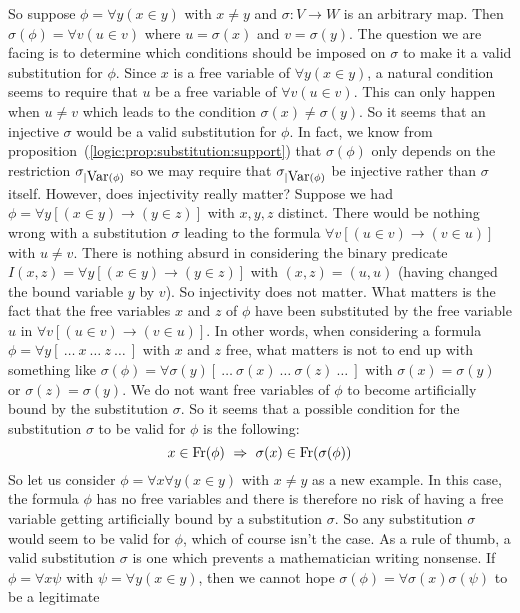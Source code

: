 So suppose $\phi=\forall y(x\in y)$ with $x\neq y$ and $\sigma:V\to
W$ is an arbitrary map. Then $\sigma(\phi) = \forall v(u\in v)$
where $u=\sigma(x)$ and $v=\sigma(y)$. The question we are facing is
to determine which conditions should be imposed on $\sigma$ to make
it a valid substitution for $\phi$. Since $x$ is a free variable of
$\forall y(x\in y)$, a natural condition seems to require that $u$
be a free variable of $\forall v(u\in v)$. This can only happen when
$u\neq v$ which leads to the condition $\sigma(x)\neq\sigma(y)$. So
it seems that an injective $\sigma$ would be a valid substitution
for $\phi$. In fact, we know from
proposition~(\ref{logic:prop:substitution:support}) that
$\sigma(\phi)$ only depends on the restriction
$\sigma_{|\mbox{\rm Var}(\phi)}$ so we may require that $\sigma_{|\mbox{\rm Var}(\phi)}$
be injective rather than $\sigma$ itself. However, does injectivity
really matter? Suppose we had $\phi=\forall y[(x\in y)\to (y\in z)]$
with $x,y,z$ distinct. There would be nothing wrong with a
substitution $\sigma$ leading to the formula $\forall v[(u\in
v)\to(v\in u)]$ with $u\neq v$. There is nothing absurd in
considering the binary predicate $I(x,z) =\forall y[(x\in y)\to(y\in
z)]$ with $(x,z)=(u,u)$ (having changed the bound variable $y$ by
$v$). So injectivity does not matter. What matters is the fact that
the free variables $x$ and $z$ of $\phi$ have been substituted by
the free variable $u$ in $\forall v[(u\in v)\to(v\in u)]$. In other
words, when considering a formula $\phi=\forall y[\ \ldots\ x\
\ldots\ z\ \ldots\ ]$ with $x$ and $z$ free, what matters is not to
end up with something like $\sigma(\phi)=\forall \sigma(y)[\ \ldots
\ \sigma(x)\ \ldots\ \sigma(z)\ \ldots\ ]$ with
$\sigma(x)=\sigma(y)$ or $\sigma(z) = \sigma(y)$. We do not want
free variables of $\phi$ to become artificially bound by the
substitution $\sigma$. So it seems that a possible condition for the
substitution $\sigma$ to be valid for $\phi$ is the following:
    \[
    x\in\free(\phi)\ \Rightarrow\ \sigma(x)\in\free(\sigma(\phi))
    \]
So let us consider $\phi=\forall x\forall y(x\in y)$ with $x\neq y$
as a new example. In this case, the formula $\phi$ has no free
variables and there is therefore no risk of having a free variable
getting artificially bound by a substitution $\sigma$. So any
substitution $\sigma$ would seem to be valid for $\phi$, which of
course isn't the case. As a rule of thumb, a valid substitution
$\sigma$ is one which prevents a mathematician writing nonsense. If
$\phi=\forall x\psi$ with $\psi=\forall y(x\in y)$, then we cannot
hope $\sigma(\phi)=\forall \sigma(x)\sigma(\psi)$ to be a legitimate
